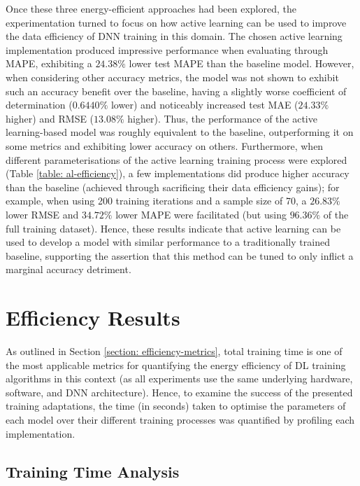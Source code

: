 \documentclass[a4paper, 11pt]{report}
\begin{document}
    Once these three energy-efficient approaches had been explored, the experimentation turned to focus on how active learning can be used to improve the data efficiency of DNN training in this domain. The chosen active learning implementation produced impressive performance when evaluating through MAPE, exhibiting a $24.38\%$ lower test MAPE than the baseline model. However, when considering other accuracy metrics, the model was not shown to exhibit such an accuracy benefit over the baseline, having a slightly worse coefficient of determination ($0.6440\%$ lower) and noticeably increased test MAE ($24.33\%$ higher) and RMSE ($13.08\%$ higher). Thus, the performance of the active learning-based model was roughly equivalent to the baseline, outperforming it on some metrics and exhibiting lower accuracy on others. Furthermore, when different parameterisations of the active learning training process were explored (Table \ref{table: al-efficiency}), a few implementations did produce higher accuracy than the baseline (achieved through sacrificing their data efficiency gains); for example, when using 200 training iterations and a sample size of 70, a $26.83\%$ lower RMSE and $34.72\%$ lower MAPE were facilitated (but using $96.36\%$ of the full training dataset). Hence, these results indicate that active learning can be used to develop a model with similar performance to a traditionally trained baseline, supporting the assertion that this method can be tuned to only inflict a marginal accuracy detriment.


    \section{Efficiency Results}

    As outlined in Section \ref{section: efficiency-metrics}, total training time is one of the most applicable metrics for quantifying the energy efficiency of DL training algorithms in this context (as all experiments use the same underlying hardware, software, and DNN architecture). Hence, to examine the success of the presented training adaptations, the time (in seconds) taken to optimise the parameters of each model over their different training processes was quantified by profiling each implementation. 


    \subsection{Training Time Analysis}
\end{document}
